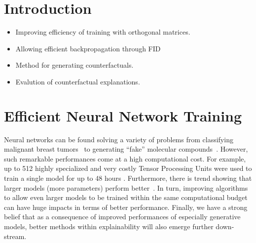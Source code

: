 \documentclass[11pt,a4paper,twoside,openright,final]{memoir}
\begin{document}
\chapter{Introduction} 



\begin{itemize} 
    \item Improving efficiency of training with orthogonal matrices.
    \item Allowing efficient backpropagation through FID
    \item Method for generating counterfactuals.
    \item Evalution of counterfactual explanations.
\end{itemize}


\chapter{Efficient Neural Network Training}\label{chap:nns}
Neural networks can be found solving a variety of problems from classifying malignant breast tumors~\cite{cancer} to generating ``fake'' molecular compounds~\cite{chem-gan}. 
However, such remarkable performances come at a high computational cost.
For example, up to 512 highly specialized and very costly Tensor Processing Units were used to train a single model for up to 48 hours \cite{biggan}. 
Furthermore, there is trend showing that larger models (more parameters) perform better~\cite{language-models-few-shot, scaling-matters}.
In turn, improving algorithms to allow even larger models to be trained within the same computational budget can have huge impacts in terms of better performance.
Finally, we have a strong belief that as a consequence of improved performances of especially generative models, better methods within explainability will also emerge further down-stream.
\end{document}
